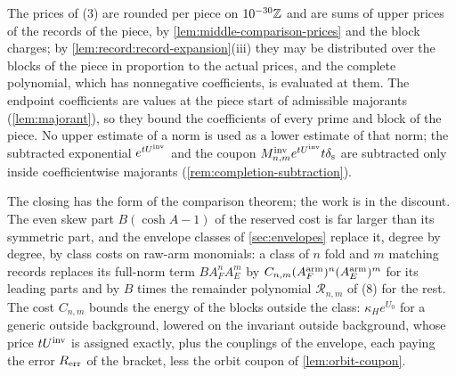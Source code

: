 The prices of (3) are rounded per piece on $10^{-30}\mathbb Z$ and are sums of upper
prices of the records of the piece, by \cref{lem:middle-comparison-prices} and
the block charges; by \cref{lem:record:record-expansion}(iii) they may be
distributed over the blocks of the piece in proportion to the actual prices,
and the complete polynomial, which has nonnegative coefficients, is evaluated
at them. The endpoint coefficients are values at the piece start of admissible
majorants (\cref{lem:majorant}), so they bound the coefficients of every prime
and block of the piece. No upper estimate of a norm is used as a lower estimate
of that norm; the subtracted exponential $e^{tU^{\mathrm{inv}}}$ and the coupon
$M^{\rm inv}_{n,m}e^{tU^{\mathrm{inv}}}t\delta_{\rm s}$ are subtracted only inside
coefficientwise majorants (\cref{rem:completion-subtraction}).

The closing has the form of the comparison theorem; the work is in the
discount. The even skew part $B(\cosh A-1)$ of the reserved cost is far larger
than its symmetric part, and the envelope classes of \cref{sec:envelopes}
replace it, degree by degree, by class costs on raw-arm monomials: a class of
$n$ fold and $m$ matching records replaces its full-norm term $BA_F^nA_E^m$ by $C_{n,m}(A^{\rm arm}_F)^n(A^{\rm arm}_E)^m$ for its leading parts and by $B$ times the remainder polynomial $\mathcal R_{n,m}$ of (8) for the rest. The cost $C_{n,m}$ bounds the energy of the blocks outside the class: $\kappa_He^{U_0}$ for a generic outside background, lowered on the invariant
outside background, whose price $tU^{\mathrm{inv}}$ is assigned exactly, plus the
couplings of the envelope, each paying the error $R_{\rm err}$ of the bracket,
less the orbit coupon of \cref{lem:orbit-coupon}.

